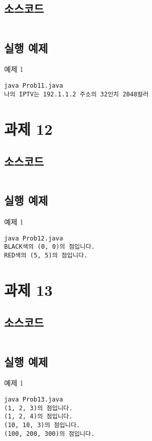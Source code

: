 \documentclass{article}
\theoremstyle{nonumberplain}
\begin{document}
\subsection{소스코드}
\begin{code}
\inputminted{java}{java/Prob11.java}
\end{code}
\subsection{실행 예제}
예제 1
\begin{code}
\begin{verbatim}
java Prob11.java
나의 IPTV는 192.1.1.2 주소의 32인치 2048컬러
\end{verbatim}
\end{code}



\section{과제 12}
\subsection{소스코드}
\begin{code}
\inputminted{java}{java/Prob12.java}
\end{code}
\subsection{실행 예제}
예제 1
\begin{code}
\begin{verbatim}
java Prob12.java
BLACK색의 (0, 0)의 점입니다.
RED색의 (5, 5)의 점입니다.
\end{verbatim}
\end{code}



\section{과제 13}
\subsection{소스코드}
\begin{code}
\inputminted{java}{java/Prob13.java}
\end{code}
\subsection{실행 예제}
예제 1
\begin{code}
\begin{verbatim}
java Prob13.java
(1, 2, 3)의 점입니다.
(1, 2, 4)의 점입니다.
(10, 10, 3)의 점입니다.
(100, 200, 300)의 점입니다.
\end{verbatim}
\end{code}
\end{document}
